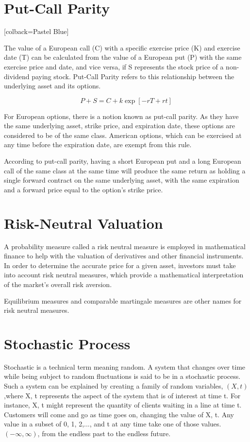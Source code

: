 \section{Put-Call Parity}

\begin{tcolorbox}
	[colback=Pastel Blue]
	\begin{definition}
		The value of a European call (C) with a specific exercise price (K) and exercise date (T) can be calculated from the value of a European put (P) with the same exercise price and date, and vice versa, if S represents the stock price of a non-dividend paying stock. Put-Call Parity refers to this relationship between the underlying asset and its options.
	\end{definition}
\end{tcolorbox}

$$P+S=C+k\exp[-rT+rt]$$

\noindent For European options, there is a notion known as put-call parity. As they have the same underlying asset, strike price, and expiration date, these options are considered to be of the same class. American options, which can be exercised at any time before the expiration date, are exempt from this rule.

\noindent According to put-call parity, having a short European put and a long European call of the same class at the same time will produce the same return as holding a single forward contract on the same underlying asset, with the same expiration and a forward price equal to the option's strike price.
\section{Risk-Neutral Valuation}
A probability measure called a risk neutral measure is employed in mathematical finance to help with the valuation of derivatives and other financial instruments. In order to determine the accurate price for a given asset, investors must take into account risk neutral measures, which provide a mathematical interpretation of the market's overall risk aversion.

Equilibrium measures and comparable martingale measures are other names for risk neutral measures. 
\section{Stochastic Process}
Stochastic is a technical term meaning random. A system that changes over time while being subject to random fluctuations is said to be in a stochastic process. Such a system can be explained by creating a family of random variables, $(X,t)$,where X, t represents the aspect of the system that is of interest at time t. For instance, X, t might represent the quantity of clients waiting in a line at time t. Customers will come and go as time goes on, changing the value of X, t. Any value in a subset of 0, 1, 2,..., and t at any time take one of those values. $(-\infty,\infty)$, from the endless past to the endless future.
